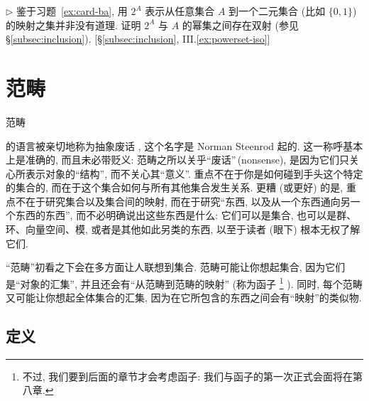 \begin{prob}
\label{ex:two-to-power}
$\triangleright$ 鉴于习题~\ref{ex:card-ba}, 用 $2^A$ 表示从任意集合 $A$ 到一个二元集合 (比如 $\{0,1\}$) 的映射之集并非没有道理. 证明 $2^A$ 与 $A$ 的幂集之间存在双射 (参见 \S\ref{subsec:inclusion}). [\S\ref{subsec:inclusion}, III.\ref{ex:powerset-iso}]
\end{prob}

\section{范畴}
\label{sec:categories}

范畴%

的语言被亲切地称为抽象废话%
, 这个名字是 Norman Steenrod 起的. 这一称呼基本上是准确的, 而且未必带贬义: 范畴之所以关乎``废话''\,(nonsense), 是因为它们只关心所表示对象的``结构'', 而不关心其``意义''. 重点不在于你是如何碰到手头这个特定的集合的, 而在于这个集合如何与所有其他集合发生关系. 更糟 (或更好) 的是, 重点不在于研究集合以及集合间的映射, 而在于研究``东西, 以及从一个东西通向另一个东西的东西'', 而不必明确说出这些东西是什么: 它们可以是集合, 也可以是群、环、向量空间、模, 或者是其他如此另类的东西, 以至于读者 (眼下) 根本无权了解它们.

``范畴''初看之下会在多方面让人联想到集合. 范畴可能让你想起集合, 因为它们是``对象的汇集'', 并且还会有``从范畴到范畴的映射'' (称为函子%
\footnote{不过, 我们要到后面的章节才会考虑函子: 我们与函子的第一次正式会面将在第八章.}%
). 同时, 每个范畴又可能让你想起全体集合的汇集, 因为在它所包含的东西之间会有``映射''的类似物.

\subsection{定义}
\label{subsec:categories-def}

